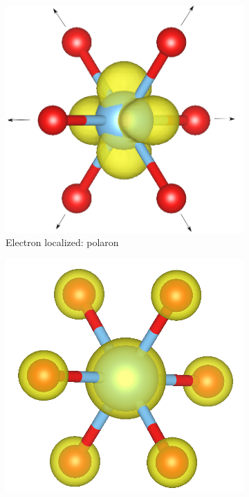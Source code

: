\begin{figure}[p]
    \centering
    \begin{subfigure}[b]{0.49\textwidth}
        \centering
        \includegraphics[width=\textwidth]{figures/PARCHG_polaron}
        \caption{Electron localized: polaron}
        \label{fig:polaron_iso}
    \end{subfigure}
    \hfill
    \begin{subfigure}[b]{0.49\textwidth}
        \centering
        \includegraphics[width=\textwidth]{figures/PARCHG_delocalized}

\end{subfigure}
\end{figure}
